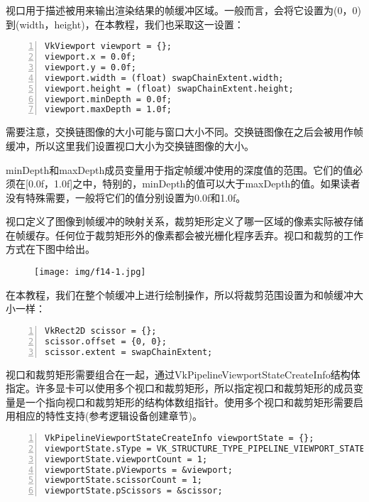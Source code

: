 \documentclass{ctexart}
\begin{document}
视口用于描述被用来输出渲染结果的帧缓冲区域。一般而言，会将它设置为(0，0)到(width，height)，在本教程，我们也采取这一设置：

\begin{lstlisting}[language={[ANSI]C},keywordstyle=\color{blue!70},commentstyle=\color{red!50!green!50!blue!50},frame=shadowbox, rulesepcolor=\color{red!20!green!20!blue!20},basicstyle=\small,numbers=left, numberstyle=\tiny,breaklines=true]
VkViewport viewport = {};
viewport.x = 0.0f;
viewport.y = 0.0f;
viewport.width = (float) swapChainExtent.width;
viewport.height = (float) swapChainExtent.height;
viewport.minDepth = 0.0f;
viewport.maxDepth = 1.0f;
\end{lstlisting}

需要注意，交换链图像的大小可能与窗口大小不同。交换链图像在之后会被用作帧缓冲，所以这里我们设置视口大小为交换链图像的大小。

minDepth和maxDepth成员变量用于指定帧缓冲使用的深度值的范围。它们的值必须在[0.0f，1.0f]之中，特别的，minDepth的值可以大于maxDepth的值。如果读者没有特殊需要，一般将它们的值分别设置为0.0f和1.0f。

视口定义了图像到帧缓冲的映射关系，裁剪矩形定义了哪一区域的像素实际被存储在帧缓存。任何位于裁剪矩形外的像素都会被光栅化程序丢弃。视口和裁剪的工作方式在下图中给出。

\begin{figure}[H]
	\centering
	\texttt{[image: img/f14-1.jpg]}
\end{figure}

在本教程，我们在整个帧缓冲上进行绘制操作，所以将裁剪范围设置为和帧缓冲大小一样：

\begin{lstlisting}[language={[ANSI]C},keywordstyle=\color{blue!70},commentstyle=\color{red!50!green!50!blue!50},frame=shadowbox, rulesepcolor=\color{red!20!green!20!blue!20},basicstyle=\small,numbers=left, numberstyle=\tiny,breaklines=true]
VkRect2D scissor = {};
scissor.offset = {0, 0};
scissor.extent = swapChainExtent;
\end{lstlisting}

视口和裁剪矩形需要组合在一起，通过VkPipelineViewportStateCreateInfo结构体指定。许多显卡可以使用多个视口和裁剪矩形，所以指定视口和裁剪矩形的成员变量是一个指向视口和裁剪矩形的结构体数组指针。使用多个视口和裁剪矩形需要启用相应的特性支持(参考逻辑设备创建章节)。

\begin{lstlisting}[language={[ANSI]C},keywordstyle=\color{blue!70},commentstyle=\color{red!50!green!50!blue!50},frame=shadowbox, rulesepcolor=\color{red!20!green!20!blue!20},basicstyle=\small,numbers=left, numberstyle=\tiny,breaklines=true]
VkPipelineViewportStateCreateInfo viewportState = {};
viewportState.sType = VK_STRUCTURE_TYPE_PIPELINE_VIEWPORT_STATE_CREATE_INFO;
viewportState.viewportCount = 1;
viewportState.pViewports = &viewport;
viewportState.scissorCount = 1;
viewportState.pScissors = &scissor;
\end{lstlisting}
\end{document}
